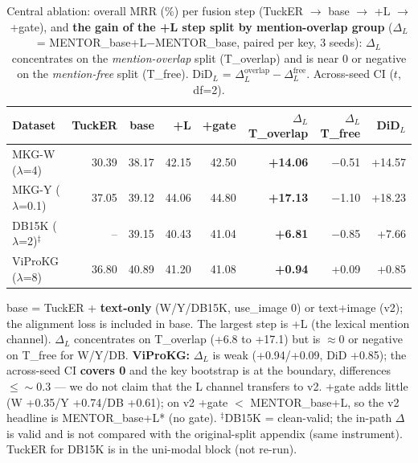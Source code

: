\begin{table}[t]
\centering
\footnotesize
\setlength{\tabcolsep}{4pt}
\caption{Central ablation: overall MRR (\%) per fusion step (TuckER $\to$ base $\to$ +L $\to$ +gate), and \textbf{the gain of the +L step split by mention-overlap group} ($\Delta_L$ = MENTOR\_base+L$-$MENTOR\_base, paired per key, 3 seeds): $\Delta_L$ concentrates on the \emph{mention-overlap} split (T\_overlap) and is near 0 or negative on the \emph{mention-free} split (T\_free). DiD$_L$ = $\Delta_L^{\text{overlap}}-\Delta_L^{\text{free}}$. Across-seed CI ($t$, df=2).}
\label{tab:trung_tam}
\begin{tabular}{l r r r r r r r}
\toprule
Dataset & TuckER & base & +L & +gate & $\Delta_L$ T\_overlap & $\Delta_L$ T\_free & DiD$_L$ \\
\midrule
MKG-W ($\lambda$=4) & 30.39 & 38.17 & 42.15 & 42.50 & \textbf{+14.06} & $-$0.51 & +14.57 \\
MKG-Y ($\lambda$=0.1) & 37.05 & 39.12 & 44.06 & 44.80 & \textbf{+17.13} & $-$1.10 & +18.23 \\
DB15K ($\lambda$=2)$^\ddagger$ & -- & 39.15 & 40.43 & 41.04 & \textbf{+6.81} & $-$0.85 & +7.66 \\
ViProKG ($\lambda$=8) & 36.80 & 40.89 & 41.20 & 41.08 & \textbf{+0.94} & +0.09 & +0.85 \\
\bottomrule
\end{tabular}
\vspace{2pt}
\begin{minipage}{\linewidth}\footnotesize\raggedright
base = TuckER + \textbf{text-only} (W/Y/DB15K, use\_image 0) or text+image (v2); the alignment loss is included in base. The largest step is +L (the lexical mention channel). $\Delta_L$ concentrates on T\_overlap (+6.8 to +17.1) but is $\approx$0 or negative on T\_free for W/Y/DB. \textbf{ViProKG:} $\Delta_L$ is weak (+0.94/+0.09, DiD +0.85); the across-seed CI \textbf{covers 0} and the key bootstrap is at the boundary, differences $\le\sim$0.3 --- we do not claim that the L channel transfers to v2. +gate adds little (W +0.35/Y +0.74/DB +0.61); on v2 +gate $<$ MENTOR\_base+L, so the v2 headline is MENTOR\_base+L* (no gate). $^\ddagger$DB15K = clean-valid; the in-path $\Delta$ is valid and is not compared with the original-split appendix (same instrument). TuckER for DB15K is in the uni-modal block (not re-run).
\end{minipage}
\end{table}
